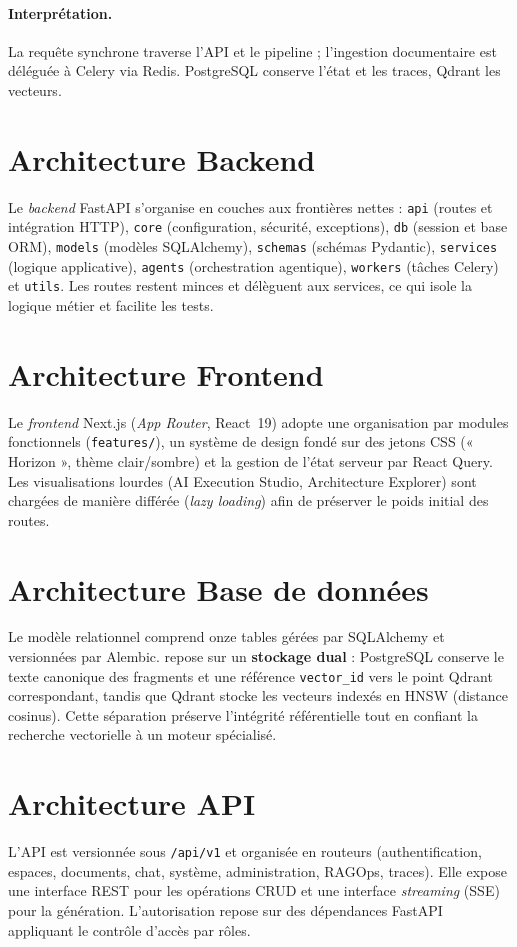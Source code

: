 \paragraph{Interprétation.} La requête synchrone traverse l'API et le pipeline ;
l'ingestion documentaire est déléguée à Celery via Redis. PostgreSQL conserve
l'état et les traces, Qdrant les vecteurs.

\section{Architecture Backend}
Le \emph{backend} FastAPI s'organise en couches aux frontières nettes :
\texttt{api} (routes et intégration HTTP), \texttt{core} (configuration, sécurité,
exceptions), \texttt{db} (session et base ORM), \texttt{models} (modèles
SQLAlchemy), \texttt{schemas} (schémas Pydantic), \texttt{services} (logique
applicative), \texttt{agents} (orchestration agentique), \texttt{workers} (tâches
Celery) et \texttt{utils}. Les routes restent minces et délèguent aux services, ce
qui isole la logique métier et facilite les tests.

\section{Architecture Frontend}
Le \emph{frontend} Next.js (\emph{App Router}, React~19) adopte une organisation
par modules fonctionnels (\texttt{features/}), un système de design fondé sur des
jetons CSS (« Horizon », thème clair/sombre) et la gestion de l'état serveur par
React Query. Les visualisations lourdes (AI Execution Studio, Architecture
Explorer) sont chargées de manière différée (\emph{lazy loading}) afin de
préserver le poids initial des routes.

\section{Architecture Base de données}
Le modèle relationnel comprend onze tables gérées par SQLAlchemy et versionnées
par Alembic. \devpilot{} repose sur un \textbf{stockage dual} : PostgreSQL
conserve le texte canonique des fragments et une référence \texttt{vector\_id}
vers le point Qdrant correspondant, tandis que Qdrant stocke les vecteurs
indexés en HNSW (distance cosinus). Cette séparation préserve l'intégrité
référentielle tout en confiant la recherche vectorielle à un moteur spécialisé.

\section{Architecture API}
L'API est versionnée sous \texttt{/api/v1} et organisée en routeurs
(authentification, espaces, documents, chat, système, administration, RAGOps,
traces). Elle expose une interface REST pour les opérations CRUD et une interface
\emph{streaming} (SSE) pour la génération. L'autorisation repose sur des
dépendances FastAPI appliquant le contrôle d'accès par rôles.

